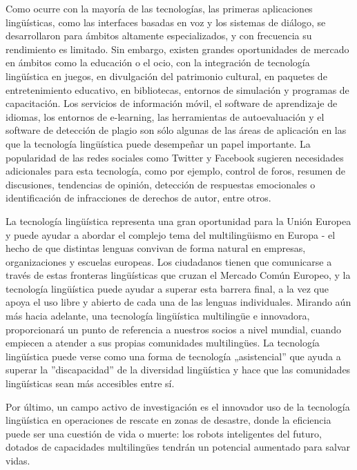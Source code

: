 \begin{multicols}{2}
Como ocurre con la mayoría de las tecnologías, las primeras aplicaciones lingüísticas, como las interfaces basadas en voz y los sistemas de diálogo, se desarrollaron para ámbitos altamente especializados, y con frecuencia su rendimiento es limitado. Sin embargo, existen grandes oportunidades de mercado en ámbitos como la educación o el ocio, con la integración de tecnología lingüística en juegos, en divulgación del patrimonio cultural, en paquetes de entretenimiento educativo, en bibliotecas, entornos de simulación y programas de capacitación. Los servicios de información móvil, el software de aprendizaje de idiomas, los entornos de e-learning, las herramientas de autoevaluación y el software de detección de plagio son sólo algunas de las áreas de aplicación en las que la tecnología lingüística puede desempeñar un papel importante. La popularidad de las redes sociales como Twitter y Facebook sugieren necesidades adicionales para esta tecnología, como por ejemplo, control de foros, resumen de discusiones, tendencias de opinión, detección de respuestas emocionales o identificación de  infracciones de derechos de autor, entre otros.


La tecnología lingüística representa una gran oportunidad para la Unión Europea y puede ayudar a abordar el complejo tema del multilingüismo en Europa - el hecho de que distintas lenguas convivan de forma natural en empresas, organizaciones y escuelas europeas. Los ciudadanos tienen que comunicarse a través de estas fronteras lingüísticas que cruzan el Mercado Común Europeo, y la tecnología lingüística puede ayudar a superar esta barrera final, a la vez que apoya el uso libre y abierto de cada una de las lenguas individuales. Mirando aún más hacia adelante, una tecnología lingüística multilingüe e innovadora, proporcionará un punto de referencia a nuestros socios a nivel mundial, cuando empiecen a atender a sus propias comunidades multilingües. La tecnología lingüística puede verse como una forma de tecnología „asistencial” que ayuda a superar la ”discapacidad” de la diversidad lingüística y hace que las comunidades lingüísticas sean más accesibles entre sí.

Por último, un campo activo de investigación es el innovador uso de la tecnología lingüística en operaciones de rescate en zonas de desastre, donde la eficiencia puede ser una cuestión de vida o muerte: los robots inteligentes del futuro, dotados de capacidades multilingües tendrán un potencial aumentado para salvar vidas.


\end{multicols}
